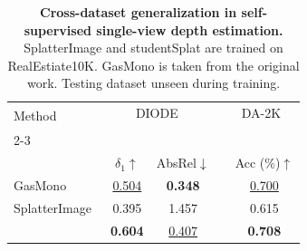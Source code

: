 \begin{table}[h!]
    \begin{center}
\footnotesize
    \setlength{\tabcolsep}{2.0pt} %
    \begin{tabular}{@{}lccc c@{}}
    \toprule
    \multirow{2}{*}[-2pt]{Method} & \multicolumn{2}{c}{DIODE~\scriptsize{\citep{vasiljevic2019diode}}}& & DA-2K~\scriptsize{\citep{yang2024depth}} \\
    \addlinespace[-12pt] \\
    \cmidrule{2-3} \cmidrule{5-5} 
    \addlinespace[-12pt] \\
    & $\delta_1$$\uparrow$ & AbsRel$\downarrow$ & & Acc (\%)$\uparrow$ \\
    \midrule
    
    GasMono~\scriptsize{\citep{zhao2023gasmono}}  & \underline{0.504} & \textbf{0.348} && \underline{0.700} \\
    {SplatterImage}~\scriptsize{\citep{szymanowicz2024splatter}} & 0.395 & 1.457 && 0.615  \\
    \cellcolor{Gray}{studentSplat} & \cellcolor{Gray}\textbf{0.604} & \cellcolor{Gray}\underline{0.407} &\cellcolor{Gray}& \cellcolor{Gray}\textbf{0.708} \\
    \bottomrule
    \end{tabular}
    \end{center}
    \caption{\textbf{Cross-dataset generalization in self-supervised single-view depth estimation.} SplatterImage and studentSplat are trained on RealEstiate10K. GasMono is taken from the original work. Testing dataset unseen during training.
    }
    \label{tab:mono_depth}
\end{table}